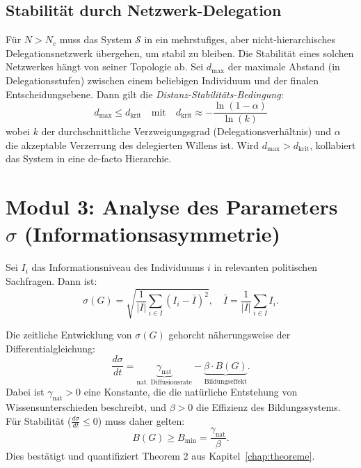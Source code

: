 \subsection{Stabilität durch Netzwerk-Delegation}

\begin{theorem}
    Für $N > N_c$ muss das System $\mathcal{S}$ in ein mehrstufiges, aber nicht-hierarchisches Delegationsnetzwerk übergehen, um stabil zu bleiben. Die Stabilität eines solchen Netzwerkes hängt von seiner Topologie ab. Sei $d_{\text{max}}$ der maximale Abstand (in Delegationsstufen) zwischen einem beliebigen Individuum und der finalen Entscheidungsebene. Dann gilt die \emph{Distanz-Stabilitäts-Bedingung}:
    \[
    \boxed{d_{\text{max}} \leq d_{\text{krit}} \quad \text{mit} \quad d_{\text{krit}} \approx -\frac{\ln(1 - \alpha)}{\ln(k)} }
    \]
    wobei $k$ der durchschnittliche Verzweigungsgrad (Delegationsverhältnis) und $\alpha$ die akzeptable Verzerrung des delegierten Willens ist. Wird $d_{\text{max}} > d_{\text{krit}}$, kollabiert das System in eine de-facto Hierarchie.
\end{theorem}

\section{Modul 3: Analyse des Parameters $\sigma$ (Informationsasymmetrie)}
\label{sec:modul_sigma}

\begin{definition}
    Sei $I_i$ das Informationsniveau des Individuums $i$ in relevanten politischen Sachfragen. Dann ist:
    \[
    \sigma(G) = \sqrt{\frac{1}{|I|} \sum_{i \in I} (I_i - \bar{I})^2}, \quad \bar{I} = \frac{1}{|I|} \sum_{i \in I} I_i.
    \]
\end{definition}

\begin{theorem}
    Die zeitliche Entwicklung von $\sigma(G)$ gehorcht näherungsweise der Differentialgleichung:
    \[
    \frac{d\sigma}{dt} = \underbrace{\gamma_{\text{nat}}}_{\text{nat. Diffusionsrate}} - \underbrace{\beta \cdot B(G)}_{\text{Bildungseffekt}}.
    \]
    Dabei ist $\gamma_{\text{nat}} > 0$ eine Konstante, die die natürliche Entstehung von Wissensunterschieden beschreibt, und $\beta > 0$ die Effizienz des Bildungssystems. Für Stabilität ($\frac{d\sigma}{dt} \leq 0$) muss daher gelten:
    \[
    \boxed{B(G) \geq B_{\min} = \frac{\gamma_{\text{nat}}}{\beta}.}
    \]
    Dies bestätigt und quantifiziert Theorem 2 aus Kapitel~\ref{chap:theoreme}.
\end{theorem}


